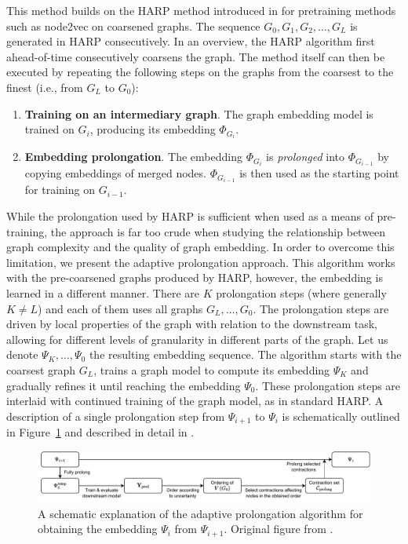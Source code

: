 This method builds on the HARP method introduced in \cite{chen_harp_2018} for pretraining methods such as node2vec on coarsened graphs. The sequence \( G_0, G_1, G_2, \dots, G_L \) is generated in HARP consecutively. In an overview, the HARP algorithm first ahead-of-time consecutively coarsens the graph. The method itself can then be executed by repeating the following steps on the graphs from the coarsest to the finest (i.e., from \( G_L \) to \( G_0 \)):
\begin{enumerate}
	\item \textbf{Training on an intermediary graph}. The graph embedding model is trained on \( G_i \), producing its embedding \( \Phi_{G_i} \).
	\item \textbf{Embedding prolongation}. The embedding \( \Phi_{G_i} \) is \textit{prolonged} into \( \Phi_{G_{i - 1}} \) by copying embeddings of merged nodes. \( \Phi_{G_{i - 1}} \) is then used as the starting point for training on \( G_{i - 1} \).
\end{enumerate}

While the prolongation used by HARP is sufficient when used as a means of pre-training, the approach is far too crude when studying the relationship between graph complexity and the quality of graph embedding. In order to overcome this limitation, we present the adaptive prolongation approach. This algorithm works with the pre-coarsened graphs produced by HARP, however, the embedding is learned in a different manner. There are \( K \) prolongation steps (where generally \( K \neq L \)) and each of them uses all graphs \( G_L, \dots, G_0 \). The prolongation steps are driven by local properties of the graph with relation to the downstream task, allowing for different levels of granularity in different parts of the graph. Let us denote \( \Psi_K, \dots, \Psi_0 \) the resulting embedding sequence. The algorithm starts with the coarsest graph \( G_L \), trains a graph model to compute its embedding \( \Psi_K \) and gradually refines it until reaching the embedding \( \Psi_0 \). These prolongation steps are interlaid with continued training of the graph model, as in standard HARP\@. A description of a single prolongation step from \( \Psi_{i + 1} \) to \( \Psi_i \) is schematically outlined in Figure~\ref{fig:adaptive-prolongation} and described in detail in \cite{dedic_balancing_2023}.

\begin{figure}
	\includegraphics[width=\linewidth]{images/adaptive-prolongation/adaptive-prolongation.pdf}
	\caption{A schematic explanation of the adaptive prolongation algorithm for obtaining the embedding \( \Psi_{i} \) from \( \Psi_{i + 1} \). Original figure from \cite{dedic_balancing_2024}.}
	\label{fig:adaptive-prolongation}
\end{figure}

